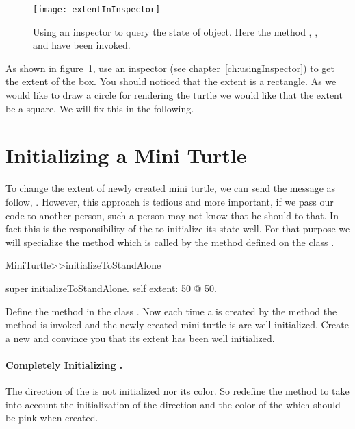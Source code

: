 \begin{figure}
\begin{center}
\texttt{[image: extentInInspector]}
\caption{Using an inspector to query the state of object. Here the
method , ,  and  have been
invoked.
\label{fig:extentInInspector}}
\end{center}
\end{figure}

As shown in figure~\ref{fig:extentInInspector}, use an inspector (see
chapter~\ref{ch:usingInspector}) to get the extent of the box. You
should noticed that the extent is a rectangle. As we would like to
draw a circle for rendering the turtle we would like that the extent
be a square.  We will fix this in the following.

\section{Initializing a Mini Turtle}

To change the extent of newly created mini turtle, we can send the
message  as follow, . However, this approach is tedious and more
important, if we pass our code to another person, such a person may
not know that he should to that. In fact this is the responsibility of
the \mt to initialize its state well. For that purpose we will
specialize the method  which is called by
the method  defined on the class .



\begin{method}
MiniTurtle>>initializeToStandAlone

   super initializeToStandAlone.
   self extent: 50 @ 50.
\end{method}

Define the method  in the class \mtc. Now
each time a \mt is created by the method  the method
 is invoked and the newly created mini
turtle is are well initialized. Create a new \mt and convince you that
its extent has been well initialized.

\paragraph{Completely Initializing \mtc.}
The direction of the \mt is not initialized nor its color.  So
redefine the  method to take into account
the initialization of the direction and the color of the \mt which
should be pink when created.

